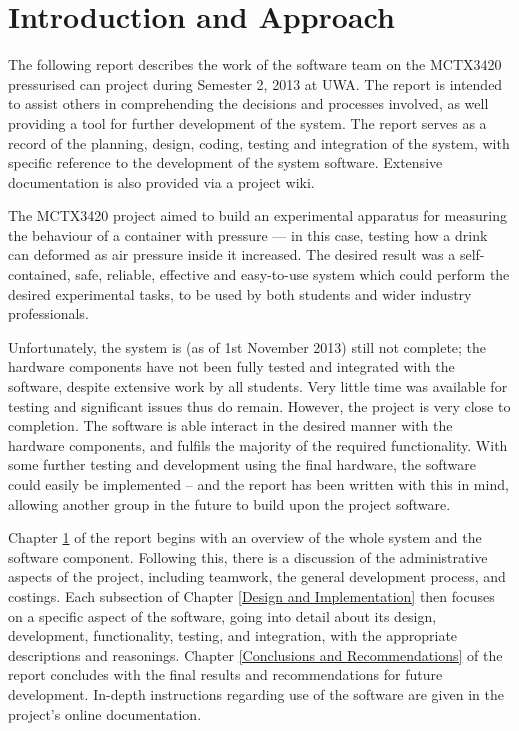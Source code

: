 \chapter{Introduction and Approach}\label{Introduction and Approach}


The following report describes the work of the software team on the MCTX3420 pressurised can project during Semester 2, 2013 at UWA. The report is intended to assist others in comprehending the decisions and processes involved, as well providing a tool for further development of the system. The report serves as a record of the planning, design, coding, testing and integration of the system, with specific reference to the development of the system software. Extensive documentation is also provided via a project wiki\cite{mctx3420_wiki}.

The MCTX3420 project aimed to build an experimental apparatus for measuring the behaviour of a container with pressure --- in this case, testing how a drink can deformed as air pressure inside it increased. The desired result was a self-contained, safe, reliable, effective and easy-to-use system which could perform the desired experimental tasks, to be used by both students and wider industry professionals.

Unfortunately, the system is (as of 1st November 2013) still not complete; the hardware components have not been fully tested and integrated with the software, despite extensive work by all students. Very little time was available for testing and significant issues thus do remain. However, the project is very close to completion. The software is able interact in the desired manner with the hardware components, and fulfils the majority of the required functionality. With some further testing and development using the final hardware, the software could easily be implemented – and the report has been written with this in mind, allowing another group in the future to build upon the project software.


Chapter \ref{Introduction and Approach} of the report begins with an overview of the whole system and the software component. Following this, there is a discussion of the administrative aspects of the project, including teamwork, the general development process, and costings. Each subsection of Chapter \ref{Design and Implementation} then focuses on a specific aspect of the software, going into detail about its design, development, functionality, testing, and integration, with the appropriate descriptions and reasonings. Chapter \ref{Conclusions and Recommendations} of the report concludes with the final results and recommendations for future development. In-depth instructions regarding use of the software are given in the project's online documentation\cite{mctx3420_wiki}.

